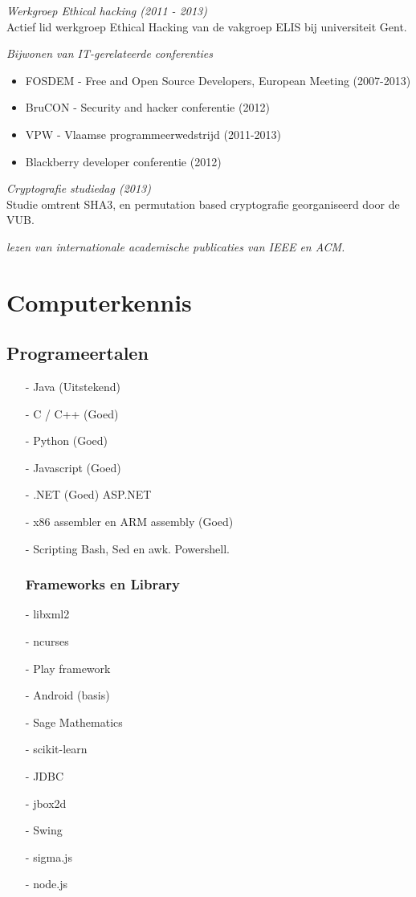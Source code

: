 \documentclass[margin, 10pt]{res} %
\begin{document}
\begin{resume}
{\sl Werkgroep Ethical hacking (2011 - 2013)} \\
Actief lid werkgroep Ethical Hacking van de vakgroep ELIS bij universiteit Gent.

{\sl Bijwonen van IT-gerelateerde conferenties}
\begin{itemize} \itemsep -2pt
\item FOSDEM - Free and Open Source Developers, European Meeting (2007-2013)
\item BruCON - Security and hacker conferentie (2012)
\item VPW - Vlaamse programmeerwedstrijd (2011-2013)
\item Blackberry developer conferentie (2012)
\end{itemize}

{\sl Cryptografie studiedag (2013)} \\
Studie omtrent SHA3, en permutation based cryptografie georganiseerd door de VUB.

{\sl lezen van internationale academische publicaties van IEEE en ACM.}

\end{resume}
\pagebreak
\section{Computerkennis}
\subsection{Programeertalen}
\begin{multicols}{2}
\begin{enumerate}
\item[-] Java (Uitstekend)
\item[-] C / C++ (Goed)
\item[-] Python (Goed)
\item[-] Javascript (Goed)
\item[-] .NET  (Goed)
\subitem ASP.NET
\item[-] x86 assembler en ARM assembly (Goed)
\item[-] Scripting
\subitem Bash, Sed en awk.
\subitem Powershell.
\subsubsection*{Frameworks en Library}
\item[-] libxml2
\item[-] ncurses
\item[-] Play framework
\item[-] Android (basis)
\item[-] Sage Mathematics
\item[-] scikit-learn
\item[-] JDBC
\item[-] jbox2d
\item[-] Swing
\item[-] sigma.js
\item[-] node.js
\end{enumerate}
\end{multicols}
\end{document}

